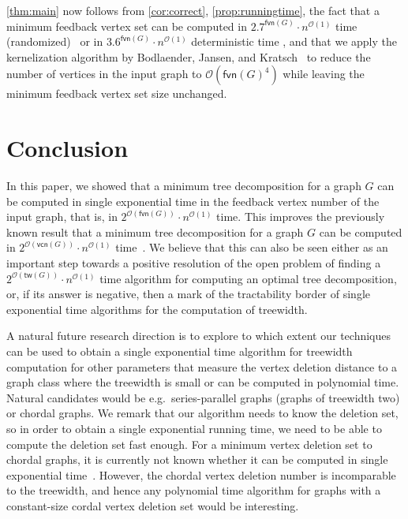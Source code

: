 \documentclass[a4paper,UKenglish,cleveref, autoref, thm-restate, numberwithinsect]{lipics-v2021}
\newcounter{algorithm}
\newcommand{\OO}{\mathcal{O}}
\newcommand{\tw}{\mathsf{tw}}
\newcommand{\fvn}{\mathsf{fvn}}
\newcommand{\vcn}{\mathsf{vcn}}
\begin{document}
\cref{thm:main} now follows from \cref{cor:correct}, \cref{prop:runningtime}, the fact that a minimum feedback vertex set can be computed in $2.7^{\fvn(G)}\cdot n^{\OO(1)}$ time (randomized)~\cite{li2022detecting} or in $3.6^{\fvn(G)}\cdot n^{\OO(1)}$ deterministic time \cite{kociumaka2014faster}, and that we apply the kernelization algorithm by Bodlaender, Jansen, and Kratsch~\cite{bodlaender2013preprocessing} to reduce the number of vertices in the input graph to $\OO(\fvn(G)^4)$ while leaving the minimum feedback vertex set size unchanged.





\section{Conclusion}\label{sec:conclusion}
In this paper, we showed that a minimum tree decomposition for a graph $G$ can be computed in single exponential time in the feedback vertex number of the input graph, that is, in $2^{\OO(\fvn(G))}\cdot n^{\OO(1)}$ time. 
This improves the previously known result that a minimum tree decomposition for a graph $G$ can be computed in $2^{\OO(\vcn(G))}\cdot n^{\OO(1)}$ time~\cite{chapelle2017treewidth,fomin2018algorithms}. 
We believe that this can also be seen either as an important step towards a positive resolution of the open problem of finding a $2^{\OO(\tw(G))}\cdot n^{\OO(1)}$ time algorithm for computing an optimal tree decomposition, or, if its answer is negative, then a mark of the tractability border of single exponential time algorithms for the computation of treewidth.

A natural future research direction is to explore to which extent our techniques can be used to obtain a single exponential time algorithm for treewidth computation for other parameters that measure the vertex deletion distance to a graph class where the treewidth is small or can be computed in polynomial time. Natural candidates would be e.g.\ series-parallel graphs (graphs of treewidth two) or chordal graphs. We remark that our algorithm needs to know the deletion set, so in order to obtain a single exponential running time, we need to be able to compute the deletion set fast enough. For a minimum vertex deletion set to chordal graphs, it is currently not known whether it can be computed in single exponential time~\cite{cao2016chordal}. However, the chordal vertex deletion number is incomparable to the treewidth, and hence any polynomial time algorithm for graphs with a constant-size cordal vertex deletion set would be interesting.





\end{document}
